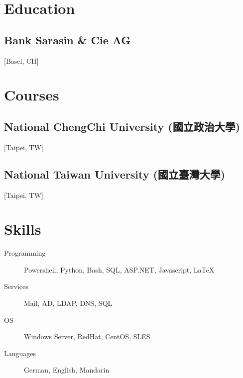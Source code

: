 \documentclass{cv}
\begin{document}
\begin{CJK*}{UTF8}{bsmi}
\section{Education}

\subsection{Bank Sarasin \& Cie AG}[Basel, CH]
\begin{positions}
\end{positions}

\section{Courses}
\subsection{National ChengChi University (國立政治大學)}[Taipei, TW]
\begin{positions}
\end{positions}

\subsection{National Taiwan University (國立臺灣大學)}[Taipei, TW]
\begin{positions}
\end{positions}

\section{Skills}

\begin{description}
  \item[Programming]
    \parbox[t]{\linegoal}{
      \strut%
      Powershell, Python, Bash, SQL, ASP.NET, Javascript, \LaTeX
      \strut%
    }
    \item[Services] Mail, AD, LDAP, DNS, SQL
    \item[OS] Windows Server, RedHat, CentOS, SLES 
    \item[Languages] German, English, Mandarin
\end{description}


\end{CJK*}
\end{document}

